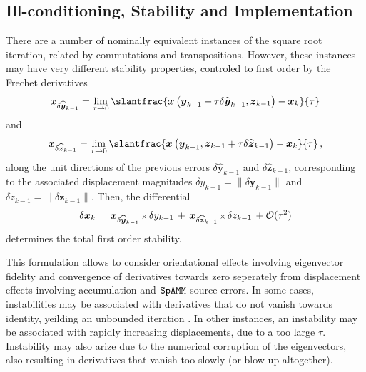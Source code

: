\documentclass[letterpaper,twocolumn,amsmath,amsfont,amssymb,english,aps,jcp,preprintnumbers,groupaddress,nofootinbib,tightenlines,floatfix]{revtex4}
\newcommand{\mat}[1]{\boldsymbol{#1}}
\theoremstyle{plain}
\theoremstyle{remark}
\theoremstyle{plain}
\begin{document}
\subsection{Ill-conditioning, Stability and Implementation}

There are a number of nominally equivalent instances of the square root iteration, related by commutations and transpositions. 
However, these instances may have very different stability properties,  controled to first order by the Frechet derivatives
\begin{equation}
  \mat{x}_{\delta \widehat{ \mat{y}}_{k-1}}
= \lim_{\tau \rightarrow 0} \slantfrac{ \mat{x} \left( \mat{y}_{k-1} + \tau \delta \widehat{\mat{y}}_{k-1} ,  {\mat{z}}_{k-1}  \right)
                                     -\mat{x}_k    }{\tau} 
 \end{equation}
and
 \begin{equation}
 \mat{x}_{\delta \widehat{ \mat{z}}_{k-1}} = \lim_{\tau \rightarrow 0}
\slantfrac{ \mat{x} \left( {\mat{y}}_{k-1} , \mat{z}_{k-1} +\tau  \delta \widehat{\mat{z}}_{k-1} \right) - \mat{x}_k   }{\tau}  \, , 
 \end{equation}
along the unit directions of the previous errors $\delta \widehat{\mat{y}}_{k-1}$ and $\delta \widehat{\mat{z}}_{k-1}$, corresponding 
to the associated displacement magnitudes $\delta y_{k-1} = \lVert \delta \mat{y}_{k-1} \rVert$  and  $\delta z_{k-1}=\lVert \delta \mat{z}_{k-1} \rVert$.
Then, the differential 
\begin{equation} \label{firstorderdual}
\delta \mat{x}_k = \,  { \mat{x}}_{\delta \widehat{\mat{y}}_{k-1}}  \, {\scriptstyle \times} \, \delta y_{k-1}
                 \, + \,  { \mat{x}}_{\delta \widehat{\mat{z}}_{k-1}}  \, {\scriptstyle \times} \, \delta z_{k-1}  \, + {\cal O}(\tau^2) 
\end{equation}
determines the total first order stability. 

This formulation allows to consider orientational effects involving eigenvector fidelity and convergence of 
derivatives towards zero seperately from displacement effects involving accumulation and $\tt SpAMM$ source errors.
In some cases, instabilities may be associated with derivatives that do not vanish towards identity, yeilding an unbounded iteration \cite{}.
In other instances, an instability may be associated with rapidly increasing displacements, due to a too large $\tau$.  Instability 
may also arize due to the numerical corruption of the eigenvectors, also resulting in derivatives that vanish too slowly (or blow up altogether).    
\end{document}
